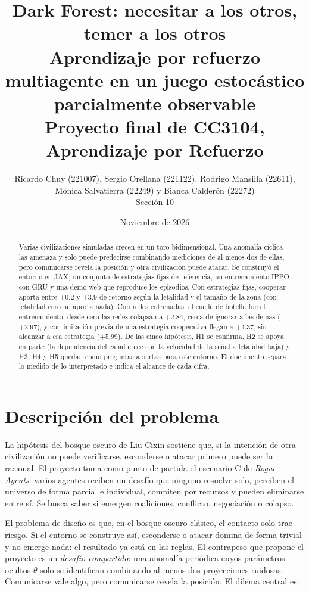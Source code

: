 \documentclass[11pt,a4paper]{article}
\title{\textbf{Dark Forest: necesitar a los otros, temer a los otros}\\[0.4em]
\large Aprendizaje por refuerzo multiagente en un juego estoc\'astico parcialmente observable\\[0.3em]
\normalsize Proyecto final de CC3104, Aprendizaje por Refuerzo}
\author{Ricardo Chuy (221007), Sergio Orellana (221122), Rodrigo Mansilla (22611),\\ M\'onica Salvatierra (22249) y Bianca Calder\'on (22272)\\ Secci\'on 10}
\date{Noviembre de 2026}
\begin{document}
\maketitle

\begin{abstract}
\noindent Varias civilizaciones simuladas crecen en un toro bidimensional. Una anomal\'ia c\'iclica las amenaza y solo puede predecirse combinando mediciones de al menos dos de ellas, pero comunicarse revela la posici\'on y otra civilizaci\'on puede atacar. Se construy\'o el entorno en JAX, un conjunto de estrategias fijas de referencia, un entrenamiento IPPO con GRU y una demo web que reproduce los episodios. Con estrategias fijas, cooperar aporta entre $+0.2$ y $+3.9$ de retorno seg\'un la letalidad y el tama\~no de la zona (con letalidad cero no aporta nada). Con redes entrenadas, el cuello de botella fue el entrenamiento: desde cero las redes colapsan a $+2.84$, cerca de ignorar a las dem\'as ($+2.97$), y con imitaci\'on previa de una estrategia cooperativa llegan a $+4.37$, sin alcanzar a esa estrategia ($+5.99$). De las cinco hip\'otesis, H1 se confirma, H2 se apoya en parte (la dependencia del canal crece con la velocidad de la se\~nal a letalidad baja) y H3, H4 y H5 quedan como preguntas abiertas para este entorno. El documento separa lo medido de lo interpretado e indica el alcance de cada cifra.
\end{abstract}

\tableofcontents
\newpage

\section{Descripci\'on del problema}

La hip\'otesis del bosque oscuro de Liu Cixin \cite{liu2015} sostiene que, si la intenci\'on de otra civilizaci\'on no puede verificarse, esconderse o atacar primero puede ser lo racional. El proyecto toma como punto de partida el escenario C de \textit{Rogue Agents}: varios agentes reciben un desaf\'io que ninguno resuelve solo, perciben el universo de forma parcial e individual, compiten por recursos y pueden eliminarse entre s\'i. Se busca saber si emergen coaliciones, conflicto, negociaci\'on o colapso.

El problema de dise\~no es que, en el bosque oscuro cl\'asico, el contacto solo trae riesgo. Si el entorno se construye as\'i, esconderse o atacar domina de forma trivial y no emerge nada: el resultado ya est\'a en las reglas. El contrapeso que propone el proyecto es un \emph{desaf\'io compartido}: una anomal\'ia peri\'odica cuyos par\'ametros ocultos $\theta$ solo se identifican combinando al menos dos proyecciones ruidosas. Comunicarse vale algo, pero comunicarse revela la posici\'on. El dilema central es:
\end{document}
